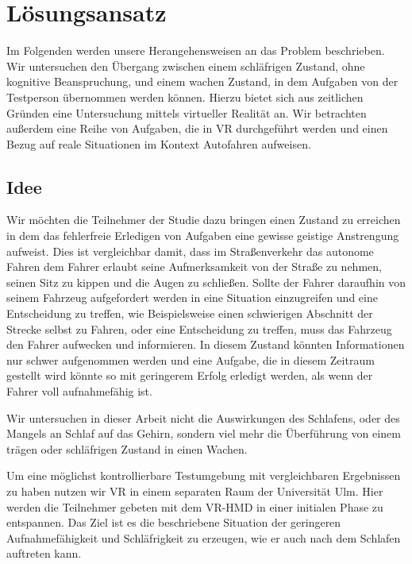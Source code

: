 \chapter{Lösungsansatz}

Im Folgenden werden unsere Herangehensweisen an das Problem beschrieben. Wir untersuchen den Übergang zwischen einem schläfrigen Zustand, ohne kognitive Beanspruchung, und einem wachen Zustand, in dem Aufgaben von der Testperson übernommen werden können. Hierzu bietet sich aus zeitlichen Gründen eine Untersuchung mittels virtueller Realität an. Wir betrachten außerdem eine Reihe von Aufgaben, die in VR durchgeführt werden und einen Bezug auf reale Situationen im Kontext Autofahren aufweisen.

\section{Idee}

Wir möchten die Teilnehmer der Studie dazu bringen einen Zustand zu erreichen in dem das fehlerfreie Erledigen von Aufgaben eine gewisse geistige Anstrengung aufweist. Dies ist vergleichbar damit, dass im Straßenverkehr das autonome Fahren dem Fahrer erlaubt seine Aufmerksamkeit von der Straße zu nehmen, seinen Sitz zu kippen und die Augen zu schließen. Sollte der Fahrer daraufhin von seinem Fahrzeug aufgefordert werden in eine Situation einzugreifen und eine Entscheidung zu treffen, wie Beispielsweise einen schwierigen Abschnitt der Strecke selbst zu Fahren, oder eine Entscheidung zu treffen, muss das Fahrzeug den Fahrer aufwecken und informieren. In diesem Zustand könnten Informationen nur schwer aufgenommen werden und eine Aufgabe, die in diesem Zeitraum gestellt wird könnte so mit geringerem Erfolg erledigt werden, als wenn der Fahrer voll aufnahmefähig ist.


Wir untersuchen in dieser Arbeit nicht die Auswirkungen des Schlafens, oder des Mangels an Schlaf auf das Gehirn, sondern viel mehr die Überführung von einem trägen oder schläfrigen Zustand in einen Wachen. 

Um eine möglichst kontrollierbare Testumgebung mit vergleichbaren Ergebnissen zu haben nutzen wir VR in einem separaten Raum der Universität Ulm. Hier werden die Teilnehmer gebeten mit dem VR-HMD in einer initialen Phase zu entspannen. Das Ziel ist es die beschriebene Situation der geringeren Aufnahmefähigkeit und Schläfrigkeit zu erzeugen, wie er auch nach dem Schlafen auftreten kann. 

